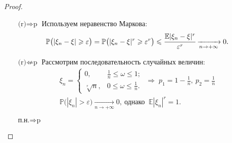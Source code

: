 \begin{proof}
    \begin{itemize}
    \item[$\text{(r)} \Rightarrow \text{p}$] 
        Используем неравенство Маркова:
        \begin{equation*}
            \mathbb{P}\bigl(|\xi_n - \xi| \geqslant \varepsilon\bigr) = \mathbb{P}\bigl(|\xi_n - \xi|^r \geqslant \varepsilon^r\bigr) \leqslant \cfrac{\mathbb{E}|\xi_n - \xi|^r}{\varepsilon^r} \xrightarrow[n \to +\infty]{} 0.
        \end{equation*}
    \item[$\text{(r)} \nLeftarrow \text{p}$]
        Рассмотрим последовательность случайных величин:
        \begin{gather*}
            \xi_n = 
            \begin{cases}
                0, & \frac{1}{n} \leqslant \omega \leqslant 1; \\
                \sqrt[r]{n}, & 0 \leqslant \omega \leqslant \frac{1}{n}.
            \end{cases}
            \; \Rightarrow \; p_1 = 1 - \frac{1}{n},~ p_2 = \frac{1}{n} \\
            \mathbb{P}\bigl( |\xi_n| > \varepsilon \bigr) \xrightarrow[n \to +\infty]{} 0,~ \text{однако $~\mathbb{E}|\xi_n|^{r} = 1$}.
        \end{gather*}
        
    \item[$\text{п.н.} \Rightarrow \text{p}$]
        

\end{itemize}
\end{proof}
